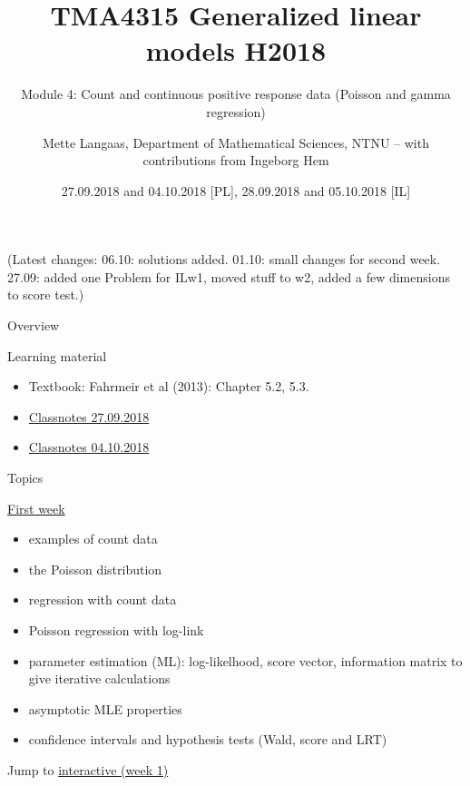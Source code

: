 \documentclass[
  ignorenonframetext,
]{beamer}
\title{TMA4315 Generalized linear models H2018}
\subtitle{Module 4: Count and continuous positive response data (Poisson
and gamma regression)}
\author{Mette Langaas, Department of Mathematical Sciences, NTNU -- with
contributions from Ingeborg Hem}
\date{27.09.2018 and 04.10.2018 {[}PL{]}, 28.09.2018 and 05.10.2018
{[}IL{]}}
\providecommand{\tightlist}{%
  \setlength{\itemsep}{0pt}\setlength{\parskip}{0pt}}
\begin{document}
\frame{\titlepage}

\begin{frame}
(Latest changes: 06.10: solutions added. 01.10: small changes for second
week. 27.09: added one Problem for ILw1, moved stuff to w2, added a few
dimensions to score test.)
\end{frame}

\begin{frame}{Overview}
\protect\hypertarget{overview}{}
\begin{block}{Learning material}
\protect\hypertarget{learning-material}{}
\begin{itemize}
\tightlist
\item
  Textbook: Fahrmeir et al (2013): Chapter 5.2, 5.3.
\item
  \href{https://www.math.ntnu.no/emner/TMA4315/2018h/TMA4315M4H20180927.pdf}{Classnotes
  27.09.2018}
\item
  \href{https://www.math.ntnu.no/emner/TMA4315/2018h/TMA4315M4H20181004.pdf}{Classnotes
  04.10.2018}
\end{itemize}
\end{block}
\end{frame}

\begin{frame}
\begin{block}{Topics}
\protect\hypertarget{topics}{}
\begin{block}{\protect\hyperlink{firstweek}{First week}}
\protect\hypertarget{first-week}{}
\begin{itemize}
\tightlist
\item
  examples of count data
\item
  the Poisson distribution
\item
  regression with count data
\item
  Poisson regression with log-link
\item
  parameter estimation (ML): log-likelhood, score vector, information
  matrix to give iterative calculations
\item
  asymptotic MLE properties
\item
  confidence intervals and hypothesis tests (Wald, score and LRT)
\end{itemize}

Jump to \protect\hyperlink{interactivew1}{interactive (week 1)}
\end{block}
\end{block}
\end{frame}
\end{document}
